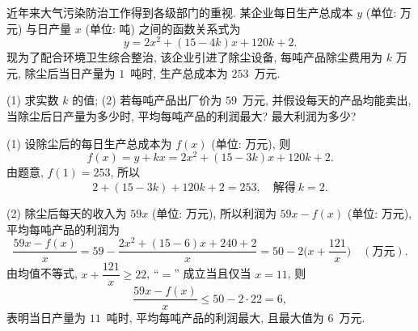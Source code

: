 \begin{example}
    近年来大气污染防治工作得到各级部门的重视. 某企业每日生产总成本 $y$ (单位: 万元) 与日产量 $x$ (单位: 吨) 之间的函数关系式为
    \[y=2x^2+(15- 4k)x+120k+2.\]
    现为了配合环境卫生综合整治, 该企业引进了除尘设备, 每吨产品除尘费用为 $k$ 万元, 除尘后当日产量为 $1$~吨时, 生产总成本为 $253$~万元.
    
    (1) 求实数 $k$ 的值;\qquad
    (2) 若每吨产品出厂价为 $59$~万元, 并假设每天的产品均能卖出, 当除尘后日产量为多少时, 平均每吨产品的利润最大? 最大利润为多少?
\end{example}
\begin{solution}
    (1) 设除尘后的每日生产总成本为 $f(x)$ (单位: 万元), 则
    \[f(x)= y+kx= 2x^2+(15- 3k)x+120k+2.\]
    由题意, $f(1)= 253$, 所以
    \[2+(15- 3k)+120k+2= 253,\quad\text{解得}\ k=2.\]
    
    (2) 除尘后每天的收入为 $59x$ (单位: 万元), 所以利润为 $59x-f(x)$  (单位: 万元), 平均每吨产品的利润为
    \[\frac{59x-f(x)}x= 59- \frac{2x^2+(15- 6)x+240+2}x
        = 50- 2\biggl(x+\frac{121}x\biggr)\quad(\text{万元}).\]
    由均值不等式, $x+\dfrac{121}x\geqslant 22$, ``$=$'' 成立当且仅当 $x=11$, 则 
    \[\frac{59x-f(x)}x\leqslant 50- 2\cdot 22= 6,\]
    表明当日产量为 $11$~吨时, 平均每吨产品的利润最大, 且最大值为 $6$~万元.
\end{solution}